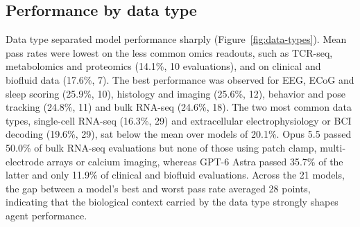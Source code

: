 \subsection*{Performance by data type}

Data type separated model performance sharply (Figure~\ref{fig:data-types}). Mean pass rates were lowest on the less common omics readouts, such as TCR-seq, metabolomics and proteomics (14.1\%, 10 evaluations), and on clinical and biofluid data (17.6\%, 7). The best performance was observed for EEG, ECoG and sleep scoring (25.9\%, 10), histology and imaging (25.6\%, 12), behavior and pose tracking (24.8\%, 11) and bulk RNA-seq (24.6\%, 18). The two most common data types, single-cell RNA-seq (16.3\%, 29) and extracellular electrophysiology or BCI decoding (19.6\%, 29), sat below the mean over models of 20.1\%. Opus 5.5 passed 50.0\% of bulk RNA-seq evaluations but none of those using patch clamp, multi-electrode arrays or calcium imaging, whereas GPT-6 Astra passed 35.7\% of the latter and only 11.9\% of clinical and biofluid evaluations. Across the 21 models, the gap between a model's best and worst pass rate averaged 28 points, indicating that the biological context carried by the data type strongly shapes agent performance.
